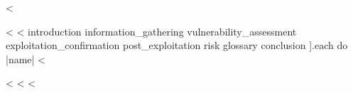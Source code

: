 \documentclass[10pt, a4paper, twoside]{report}
\begin{document}
  

  \tableofcontents

  \sloppy

  <%

  <%
    <%
      introduction
      information_gathering
      vulnerability_assessment
      exploitation_confirmation
      post_exploitation
      risk
      glossary
      conclusion
    ].each do |name| %
      <%
        
      <%
    <%
  <%

  \printbibliography{}
\end{document}
